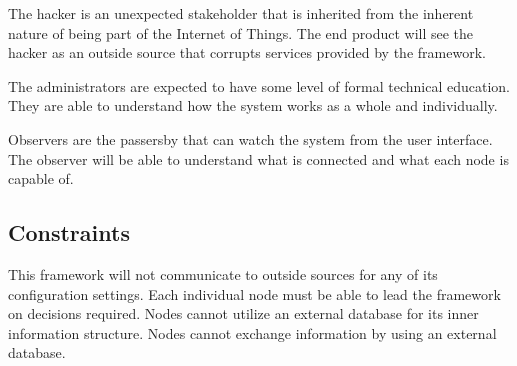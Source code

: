 \documentclass[draftclsnofoot, onecolumn, compsoc, 10pt]{IEEEtran}
\begin{document}
The hacker is an unexpected stakeholder that is inherited from the inherent nature of being part of the Internet of Things. The end product will see the hacker as an outside source that corrupts services provided by the framework. 

The administrators are expected to have some level of formal technical education. They are able to understand how the system works as a whole and individually.

Observers are the passersby that can watch the system from the user interface. The observer will be able to understand what is connected and what each node is capable of.

\subsection{Constraints}
This framework will not communicate to outside sources for any of its configuration settings. Each individual node must be able to lead the framework on decisions required. Nodes cannot utilize an external database for its inner information structure. Nodes cannot exchange information by using an external database.




\end{document}
